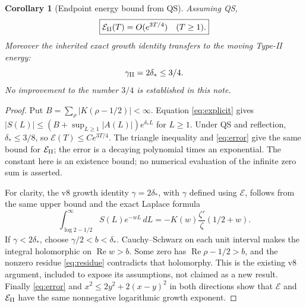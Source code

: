 \documentclass[11pt]{article}
\newtheorem{corollary}{Corollary}
\newcommand{\dd}{\,d}
\newcommand{\Ree}{\operatorname{Re}}
\newcommand{\E}{\mathcal E}
\begin{document}
\begin{corollary}[Endpoint energy bound from QS]\label{cor:energy}
Assuming QS,
\[
 \boxed{\E_{\rm II}(T)=O(e^{3T/4})\quad(T\ge1).}
\]
Moreover the inherited exact growth identity transfers to the moving
Type-II energy:
\begin{equation}\label{eq:gamma}
 \gamma_{\rm II}=2\delta_*\le3/4.
\end{equation}
No improvement to the number $3/4$ is established in this note.
\end{corollary}
\begin{proof}
Put $B=\sum_\rho|K(\rho-1/2)|<\infty$. Equation \eqref{eq:explicit} gives
$|S(L)|\le(B+\sup_{L\ge1}|A(L)|)e^{\delta_* L}$ for $L\ge1$.
Under QS and reflection, $\delta_*\le3/8$, so
$\E(T)\le C e^{3T/4}$. The triangle inequality and \eqref{eq:error} give
the same bound for $\E_{\rm II}$; the error is a decaying polynomial times
an exponential. The constant here is an existence bound; no numerical
evaluation of the infinite zero sum is asserted.

For clarity, the v8 growth identity $\gamma=2\delta_*$, with $\gamma$ defined
using $\E$, follows from the same upper bound and the exact Laplace formula
\[
 \int_{\log2-1/2}^{\infty}S(L)e^{-wL}\dd L
       =-K(w)\frac{\zeta'}{\zeta}(1/2+w).
\]
If $\gamma<2\delta_*$, choose $\gamma/2<b<\delta_*$. Cauchy--Schwarz on
each unit interval makes the integral holomorphic on $\Ree w>b$.
Some zero has $\Ree\rho-1/2>b$, and the nonzero residue
\eqref{eq:residue} contradicts that holomorphy. This is the existing v8
argument, included to expose its assumptions, not claimed as a new result.
Finally \eqref{eq:error} and
$x^2\le2y^2+2(x-y)^2$ in both directions show that $\E$ and
$\E_{\rm II}$ have the same nonnegative logarithmic growth exponent.
\end{proof}
\end{document}
